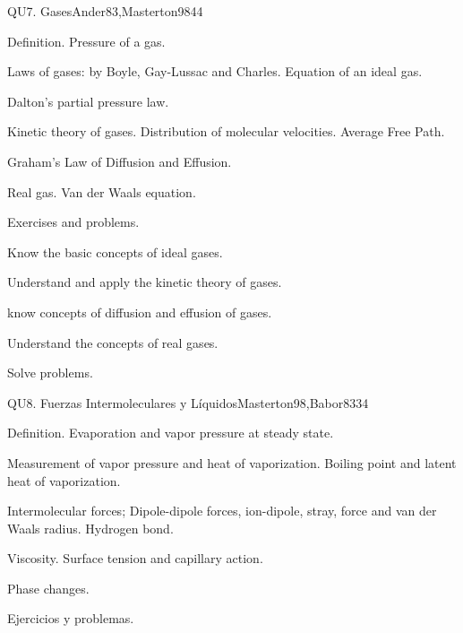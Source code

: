 \begin{syllabus}
\begin{unit}{}{QU7. Gases}{Ander83,Masterton98}{4}{4}
\begin{topics}
      \item Definition. Pressure of a gas.
      \item Laws of gases: by Boyle, Gay-Lussac and Charles. Equation of an ideal gas.
      \item Dalton's partial pressure law.
      \item Kinetic theory of gases. Distribution of molecular velocities. Average Free Path.
      \item Graham's Law of Diffusion and Effusion.
      \item Real gas. Van der Waals equation.
      \item Exercises and problems.
   \end{topics}

   \begin{learningoutcomes}

      \item Know the basic concepts of ideal gases.
      \item Understand and apply the kinetic theory of gases.
      \item know concepts of diffusion and effusion of gases.
      \item Understand the concepts of real gases.
      \item Solve problems.

   \end{learningoutcomes}
\end{unit}

\begin{unit}{}{QU8. Fuerzas Intermoleculares y Líquidos}{Masterton98,Babor83}{3}{4}
\begin{topics}

      \item Definition. Evaporation and vapor pressure at steady state.
      \item Measurement of vapor pressure and heat of vaporization. Boiling point and latent heat of vaporization.
      \item Intermolecular forces; Dipole-dipole forces, ion-dipole, stray, force and van der Waals radius. Hydrogen bond.
      \item Viscosity. Surface tension and capillary action.
      \item Phase changes.
      \item Ejercicios y problemas.
    \end{topics}


\end{unit}
\end{syllabus}

